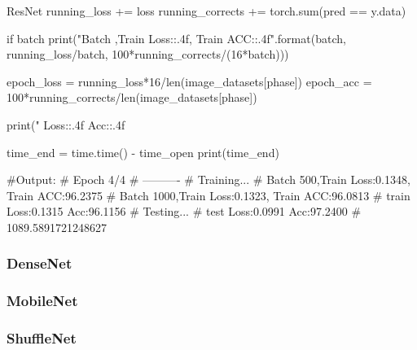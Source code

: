 \documentclass[openbib]{article}
\begin{document}
\begin{Python}{ResNet}
	running_loss += loss
	running_corrects += torch.sum(pred == y.data)
	
	if batch%
	print("Batch {},Train Loss:{:.4f}, Train ACC:{:.4f}".format(batch, running_loss/batch,
	100*running_corrects/(16*batch)))
	
	epoch_loss = running_loss*16/len(image_datasets[phase])
	epoch_acc = 100*running_corrects/len(image_datasets[phase])
	
	print("{} Loss:{:.4f} Acc:{:.4f}%
	
	time_end = time.time() - time_open
	print(time_end)
	
	#Output:
	#		Epoch 4/4
	#		----------
	#		Training...
	#		Batch 500,Train Loss:0.1348, Train ACC:96.2375
	#		Batch 1000,Train Loss:0.1323, Train ACC:96.0813
	#		train Loss:0.1315 Acc:96.1156%
	#		Testing...
	#		test Loss:0.0991 Acc:97.2400%
	#		1089.5891721248627
	
\end{Python}
\subsubsection{DenseNet}
\subsubsection{MobileNet}
\subsubsection{ShuffleNet}
\end{document}
